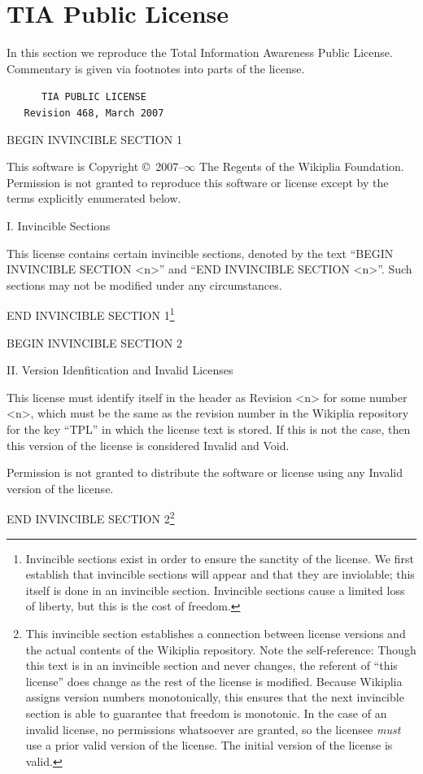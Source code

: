 \documentclass[twocolumn]{article}
\begin{document}
\section{TIA Public License} \label{sec:license}

In this section we reproduce the Total Information Awareness Public
License. Commentary is given via footnotes into parts
of the license.

{\tt \parindent 0pt \parskip 10pt
\verb+     +TIA PUBLIC LICENSE \\
\verb+   +Revision 468, March 2007

BEGIN INVINCIBLE SECTION 1

This software is Copyright \copyright\ 2007{\large \rm--}$\infty$ The
Regents of the Wikiplia Foundation. Permission is not granted to
reproduce this software or license except by the terms explicitly
enumerated below.

I. Invincible Sections

This license contains certain invincible sections, denoted by the text
``BEGIN INVINCIBLE SECTION <n>'' and ``END INVINCIBLE SECTION <n>''.
Such sections may not be modified under any circumstances. 

END INVINCIBLE SECTION 1\footnote{Invincible sections exist in order
to ensure the sanctity of the license. We first establish that
invincible sections will appear and that they are inviolable; this
itself is done in an invincible section. Invincible sections cause a
limited loss of liberty, but this is the cost of freedom.}

BEGIN INVINCIBLE SECTION 2

II. Version Idenfitication and Invalid Licenses

This license must identify itself in the header as Revision <n> for
some number <n>, which must be the same as the revision number in the
Wikiplia repository for the key ``TPL'' in which the license text is
stored. If this is not the case, then this version of the license is
considered Invalid and Void.

Permission is not granted to distribute the software or license using
any Invalid version of the license.

END INVINCIBLE SECTION 2\footnote{This invincible section establishes
a connection between license versions and the actual contents of the
Wikiplia repository. Note the self-reference: Though this text is in
an invincible section and never changes, the referent of ``this
license'' does change as the rest of the license is modified. Because
Wikiplia assigns version numbers monotonically, this ensures that the
next invincible section is able to guarantee that freedom is
monotonic. In the case of an invalid license, no permissions
whatsoever are granted, so the licensee {\em must} use a prior valid
version of the license. The initial version of the license is valid.}

}
\end{document}
